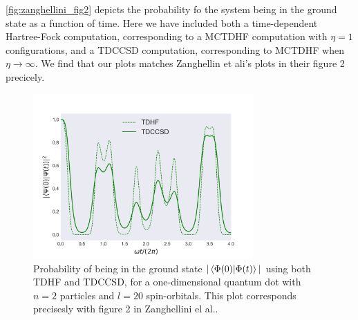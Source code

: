 \autoref{fig:zanghellini_fig2} depicts the probability fo the system being in the ground 
state as a function of time. Here we have included both a time-dependent Hartree-Fock
computation, corresponding to a MCTDHF computation with $\eta=1$ configurations, and 
a TDCCSD computation, corresponding to MCTDHF when $\eta\to\infty$. We find that our plots
matches Zanghellin et ali's plots in their figure 2 precicely. 

\begin{figure}
    \centering
    \includegraphics[width=0.75\textwidth]{results/figures/zanghellini_fig2.png}
    \caption{
        \label{fig:zanghellini_fig2}
        Probability of being in the ground state $|\braket{\Phi(0)}{\Phi(t)}|$
        using both TDHF and TDCCSD, for a one-dimensional quantum dot with $n=2$
        particles and $l=20$ spin-orbitals. This plot corresponds precisesly with 
        figure 2 in Zanghellini el al.\cite{Zanghellini04}.
    }           
\end{figure}